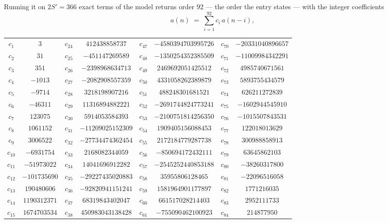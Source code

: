 \documentclass[11pt,a4paper]{article}
\theoremstyle{plain}
\theoremstyle{definition}
\begin{document}
Running it on $2S'=366$ exact terms of the model returns order $92$ --- the order the
entry states --- with the integer coefficients
\[
a(n)\;=\;\sum_{i=1}^{92}c_i\,a(n-i),
\]
\begin{center}\small
\begin{tabular}{cccccccc}
$c_{1}$ & $3$ & $c_{24}$ & $412438858737$ & $c_{47}$ & $-4580394703995726$ & $c_{70}$ & $-20331040896657$ \\
$c_{2}$ & $31$ & $c_{25}$ & $-451147269589$ & $c_{48}$ & $-1350254352385509$ & $c_{71}$ & $-11009984342291$ \\
$c_{3}$ & $351$ & $c_{26}$ & $-2398968634713$ & $c_{49}$ & $2469692051425512$ & $c_{72}$ & $4985740671561$ \\
$c_{4}$ & $-1013$ & $c_{27}$ & $-2082908557359$ & $c_{50}$ & $4331058262389879$ & $c_{73}$ & $5893755434579$ \\
$c_{5}$ & $-9714$ & $c_{28}$ & $3218198907216$ & $c_{51}$ & $488248301681521$ & $c_{74}$ & $626211272839$ \\
$c_{6}$ & $-46311$ & $c_{29}$ & $11316894882221$ & $c_{52}$ & $-2691744824773241$ & $c_{75}$ & $-1602944545910$ \\
$c_{7}$ & $123075$ & $c_{30}$ & $5914053584393$ & $c_{53}$ & $-2100751814256350$ & $c_{76}$ & $-1015507843531$ \\
$c_{8}$ & $1061152$ & $c_{31}$ & $-11209025152309$ & $c_{54}$ & $1909405156088453$ & $c_{77}$ & $122018013629$ \\
$c_{9}$ & $3006522$ & $c_{32}$ & $-27734474362454$ & $c_{55}$ & $2172184779287738$ & $c_{78}$ & $300988858913$ \\
$c_{10}$ & $-6931754$ & $c_{33}$ & $2168082344059$ & $c_{56}$ & $-850694172432111$ & $c_{79}$ & $63645862103$ \\
$c_{11}$ & $-51973022$ & $c_{34}$ & $14041696912282$ & $c_{57}$ & $-2545252440853188$ & $c_{80}$ & $-38260317800$ \\
$c_{12}$ & $-101735690$ & $c_{35}$ & $-29227435020883$ & $c_{58}$ & $35955806128465$ & $c_{81}$ & $-22096516058$ \\
$c_{13}$ & $190480606$ & $c_{36}$ & $-92820941151241$ & $c_{59}$ & $1581964901177897$ & $c_{82}$ & $1771216035$ \\
$c_{14}$ & $1190312371$ & $c_{37}$ & $68319843402047$ & $c_{60}$ & $661517028214403$ & $c_{83}$ & $2952111733$ \\
$c_{15}$ & $1674703534$ & $c_{38}$ & $450983043138428$ & $c_{61}$ & $-755090462100923$ & $c_{84}$ & $214877950$ \\

\end{tabular}
\end{center}
\end{document}
